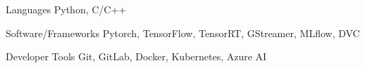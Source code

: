 

\begin{cvskills}
  \cvskill
    {Languages} %
    {Python, C/C++} %

  \cvskill
    {Software/Frameworks} %
    {Pytorch, TensorFlow, TensorRT, GStreamer, MLflow, DVC} %


  \cvskill
    {Developer Tools} %
    {Git, GitLab, Docker, Kubernetes, Azure AI} %


\end{cvskills}
